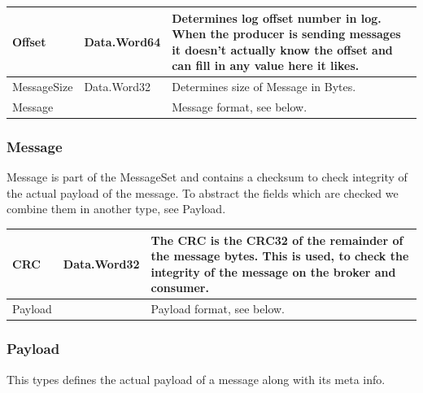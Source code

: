\begin{table}[H]
\centering
\begin{tabular}{ l  l  p{11cm} }
\hline
Offset      & Data.Word64 & Determines log offset number in log.  When the producer is sending messages it doesn't actually know the offset and can fill in any value here it likes. \\ \hline
MessageSize & Data.Word32 & Determines size of Message in Bytes.               \\ \hline
Message     &     & Message format, see below.                                                                                                                    \\ \hline
\end{tabular}
\end{table}

\subsubsection{Message}
Message is part of the MessageSet and contains a checksum to check integrity of
the actual payload of the message. To abstract the fields which are checked we
combine them in another type, see Payload.


\begin{table}[H]
\centering
\begin{tabular}{ l  l  p{11cm} }
\hline
CRC     & Data.Word32 & The CRC is the CRC32 of the remainder of the message bytes. This is used, to check the integrity of the message on the broker and consumer. \\ \hline
Payload &      & Payload format, see below.                                                                                                                  \\ \hline
\end{tabular}
\end{table}

\subsubsection{Payload}
This types defines the actual payload of a message along with its meta info.

